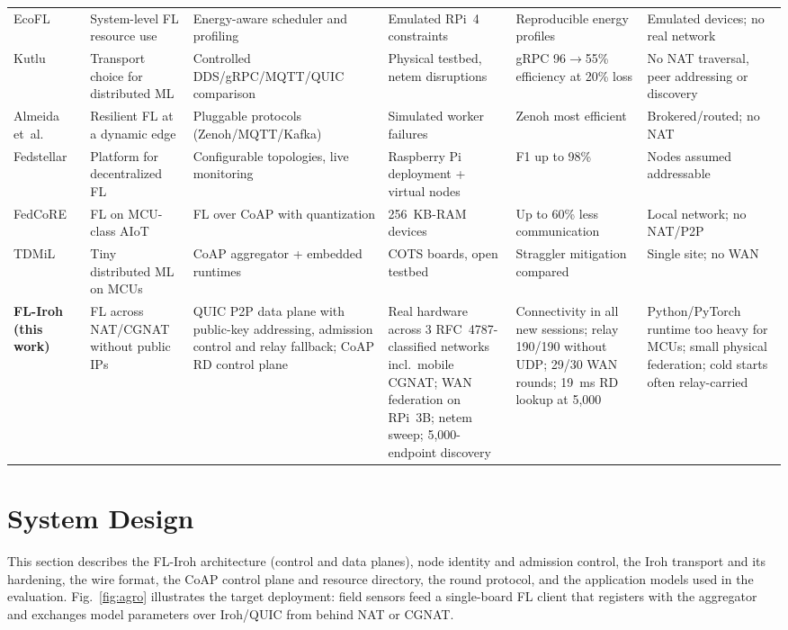 \documentclass[a4paper,fleqn]{cas-dc}
\begin{document}
\begin{table}[!t]
\begin{tabular}{@{}p{1.75cm} p{2.6cm} p{3.0cm} p{2.9cm} p{2.6cm} p{3.6cm}@{}}
EcoFL~\cite{miller2026} & System-level FL resource use & Energy-aware scheduler and profiling & Emulated RPi~4 constraints & Reproducible energy profiles & Emulated devices; no real network \\
Kutlu~\cite{kutlu2026} & Transport choice for distributed ML & Controlled DDS/gRPC/MQTT/QUIC comparison & Physical testbed, netem disruptions & gRPC 96$\to$55\% efficiency at 20\% loss & No NAT traversal, peer addressing or discovery \\
Almeida et~al.~\cite{almeida2025} & Resilient FL at a dynamic edge & Pluggable protocols (Zenoh/MQTT/Kafka) & Simulated worker failures & Zenoh most efficient & Brokered/routed; no NAT \\
Fedstellar~\cite{martinezbeltran2024} & Platform for decentralized FL & Configurable topologies, live monitoring & Raspberry Pi deployment + virtual nodes & F1 up to 98\% & Nodes assumed addressable \\
FedCoRE~\cite{djamaa2025} & FL on MCU-class AIoT & FL over CoAP with quantization & 256~KB-RAM devices & Up to 60\% less communication & Local network; no NAT/P2P \\
TDMiL~\cite{gulati2024} & Tiny distributed ML on MCUs & CoAP aggregator + embedded runtimes & COTS boards, open testbed & Straggler mitigation compared & Single site; no WAN \\
\midrule
\textbf{FL-Iroh (this work)} & FL across NAT/CGNAT without public IPs & QUIC P2P data plane with public-key addressing, admission control and relay fallback; CoAP RD control plane & Real hardware across 3 RFC~4787-classified networks incl.\ mobile CGNAT; WAN federation on RPi~3B; netem sweep; 5{,}000-endpoint discovery & Connectivity in all new sessions; relay 190/190 without UDP; 29/30 WAN rounds; 19~ms RD lookup at 5{,}000 & Python/PyTorch runtime too heavy for MCUs; small physical federation; cold starts often relay-carried \\
\bottomrule
\end{tabular}
\end{table}

\section{System Design}
\label{sec:system}

This section describes the FL-Iroh architecture (control and data planes), node identity and admission control, the Iroh transport and its hardening, the wire format, the CoAP control plane and resource directory, the round protocol, and the application models used in the evaluation. Fig.~\ref{fig:agro} illustrates the target deployment: field sensors feed a single-board FL client that registers with the aggregator and exchanges model parameters over Iroh/QUIC from behind NAT or CGNAT.
\end{document}
